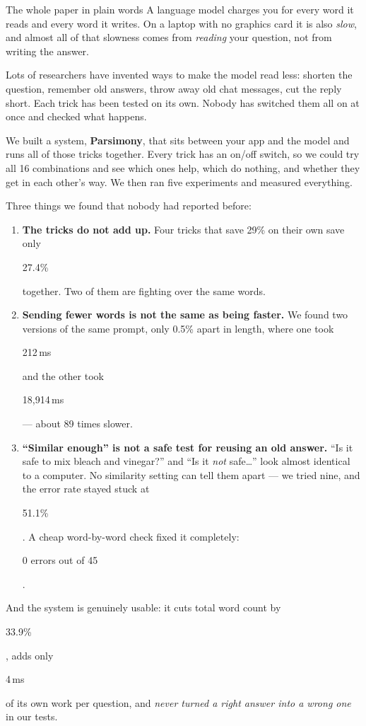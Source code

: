 \documentclass[11pt,a4paper]{article}
\newcommand{\hl}[1]{\colorbox{hlyellow}{\strut #1}}
\begin{document}
\begin{keybox}{The whole paper in plain words}
\small
A language model charges you for every word it reads and every word it writes.
On a laptop with no graphics card it is also \emph{slow}, and almost all of that
slowness comes from \emph{reading} your question, not from writing the answer.

Lots of researchers have invented ways to make the model read less: shorten the
question, remember old answers, throw away old chat messages, cut the reply
short. Each trick has been tested on its own. Nobody has switched them all on at
once and checked what happens.

We built a system, \textbf{Parsimony}, that sits between your app and the model
and runs all of those tricks together. Every trick has an on/off switch, so we
could try all 16 combinations and see which ones help, which do nothing, and
whether they get in each other's way. We then ran five experiments and measured
everything.

\medskip
\noindent Three things we found that nobody had reported before:
\begin{enumerate}[leftmargin=1.6em]
\item \textbf{The tricks do not add up.} Four tricks that save 29\% on their own
  save only \hl{27.4\%} together. Two of them are fighting over the same words.
\item \textbf{Sending fewer words is not the same as being faster.} We found two
  versions of the same prompt, only 0.5\% apart in length, where one took
  \hl{212\,ms} and the other took \hl{18{,}914\,ms} --- about 89 times slower.
\item \textbf{``Similar enough'' is not a safe test for reusing an old answer.}
  ``Is it safe to mix bleach and vinegar?'' and ``Is it \emph{not} safe\ldots''
  look almost identical to a computer. No similarity setting can tell them
  apart --- we tried nine, and the error rate stayed stuck at \hl{51.1\%}. A
  cheap word-by-word check fixed it completely: \hl{0 errors out of 45}.
\end{enumerate}

\medskip
\noindent And the system is genuinely usable: it cuts total word count by
\hl{33.9\%}, adds only \hl{4\,ms} of its own work per question, and \emph{never
turned a right answer into a wrong one} in our tests.
\end{keybox}
\end{document}
